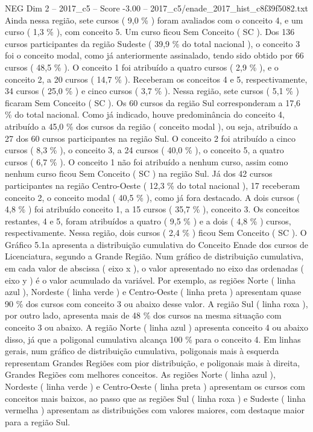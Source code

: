 \begin{textsample}{NEG Dim 2 – 2017\_c5 – Score -3.00 – 2017\_c5/enade\_2017\_hist\_c8f39f5082.txt}
Ainda nessa região, sete cursos ( 9,0 \% ) foram avaliados com o conceito 4, e um curso ( 1,3 \% ), com conceito 5.
Um curso ficou Sem Conceito ( SC ).
Dos 136 cursos participantes da região Sudeste ( 39,9 \% do total nacional ), o conceito 3 foi o conceito modal, como já anteriormente assinalado, tendo sido obtido por 66 cursos ( 48,5 \% ).
O conceito 1 foi atribuído a quatro cursos ( 2,9 \% ), e o conceito 2, a 20 cursos ( 14,7 \% ).
Receberam os conceitos 4 e 5, respectivamente, 34 cursos ( 25,0 \% ) e cinco cursos ( 3,7 \% ).
Nessa região, sete cursos ( 5,1 \% ) ficaram Sem Conceito ( SC ).
Os 60 cursos da região Sul corresponderam a 17,6 \% do total nacional.
Como já indicado, houve predominância do conceito 4, atribuído a 45,0 \% dos cursos da região ( conceito modal ), ou seja, atribuído a 27 dos 60 cursos participantes na região Sul.
O conceito 2 foi atribuído a cinco cursos ( 8,3 \% ), o conceito 3, a 24 cursos ( 40,0 \% ), o conceito 5, a quatro cursos ( 6,7 \% ).
O conceito 1 não foi atribuído a nenhum curso, assim como nenhum curso ficou Sem Conceito ( SC ) na região Sul.
Já dos 42 cursos participantes na região Centro-Oeste ( 12,3 \% do total nacional ), 17 receberam conceito 2, o conceito modal ( 40,5 \% ), como já fora destacado.
A dois cursos ( 4,8 \% ) foi atribuído conceito 1, a 15 cursos ( 35,7 \% ), conceito 3.
Os conceitos restantes, 4 e 5, foram atribuídos a quatro ( 9,5 \% ) e a dois ( 4,8 \% ) cursos, respectivamente.
Nessa região, dois cursos ( 2,4 \% ) ficou Sem Conceito ( SC ).
O Gráfico 5.1a apresenta a distribuição cumulativa do Conceito Enade dos cursos de Licenciatura, segundo a Grande Região.
Num gráfico de distribuição cumulativa, em cada valor de abscissa ( eixo x ), o valor apresentado no eixo das ordenadas ( eixo y ) é o valor acumulado da variável.
Por exemplo, as regiões Norte ( linha azul ), Nordeste ( linha verde ) e Centro-Oeste ( linha preta ) apresentam quase 90 \% dos cursos com conceito 3 ou abaixo desse valor.
A região Sul ( linha roxa ), por outro lado, apresenta mais de 48 \% dos cursos na mesma situação com conceito 3 ou abaixo.
A região Norte ( linha azul ) apresenta conceito 4 ou abaixo disso, já que a poligonal cumulativa alcança 100 \% para o conceito 4.
Em linhas gerais, num gráfico de distribuição cumulativa, poligonais mais à esquerda representam Grandes Regiões com pior distribuição, e poligonais mais à direita, Grandes Regiões com melhores conceitos.
As regiões Norte ( linha azul ), Nordeste ( linha verde ) e Centro-Oeste ( linha preta ) apresentam os cursos com conceitos mais baixos, ao passo que as regiões Sul ( linha roxa ) e Sudeste ( linha vermelha ) apresentam as distribuições com valores maiores, com destaque maior para a região Sul.

\end{textsample}
